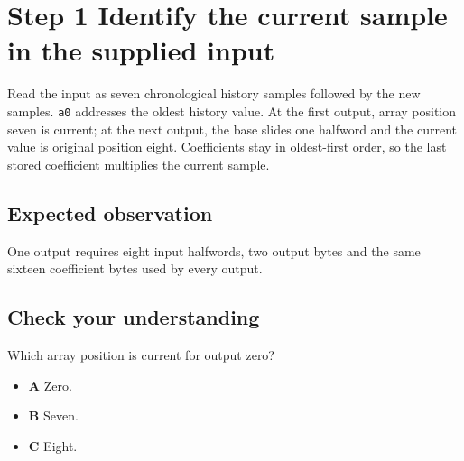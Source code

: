 \section{Step 1 Identify the current sample in the supplied input}\label{fir-s01}

Read the input as seven chronological history samples followed by the new samples. \texttt{a0} addresses the oldest history value. At the first output, array position seven is current; at the next output, the base slides one halfword and the current value is original position eight. Coefficients stay in oldest-first order, so the last stored coefficient multiplies the current sample.

\subsection{Expected observation}
One output requires eight input halfwords, two output bytes and the same sixteen coefficient bytes used by every output.

\subsection{Check your understanding}
Which array position is current for output zero?

\begin{itemize}
  \item \textbf{A} Zero.
  \item \textbf{B} Seven.
  \item \textbf{C} Eight.
\end{itemize}

